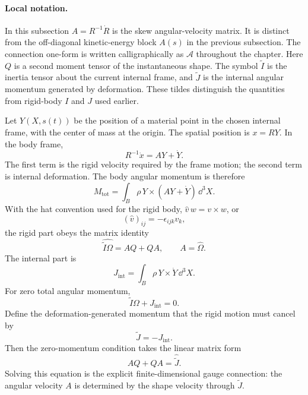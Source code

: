 \paragraph{Local notation.}
In this subsection \(A=R^{-1}\dot R\) is the skew angular-velocity matrix.  It
is distinct from the off-diagonal kinetic-energy block \(A(s)\) in the previous
subsection.  The connection one-form is written calligraphically as
\(\mathcal A\) throughout the chapter.  Here \(Q\) is a second moment tensor of
the instantaneous shape.  The symbol \(\widetilde I\) is the inertia tensor
about the current internal frame, and \(\widetilde J\) is the internal angular
momentum generated by deformation. These tildes distinguish the quantities from
rigid-body \(I\) and \(J\) used earlier.

Let \(Y(X,s(t))\) be the position of a material point in the chosen internal
frame, with the center of mass at the origin. The spatial position is
\(x=RY\). In the body frame,
\[
  R^{-1}\dot x=A Y+\dot Y.
\]
The first term is the rigid velocity required by the frame motion; the second
term is internal deformation. The body angular momentum is therefore
\[
  M_{\mathrm{tot}}
  =
  \int_B\rho\,Y\times(AY+\dot Y)\,\dd^3X.
\]
With the hat convention used for the rigid body,
\(\widehat v\,w=v\times w\), or
\[
  (\widehat v)_{ij}=-\epsilon_{ijk}v_k,
\]
the rigid part obeys the matrix identity
\[
  \widehat{\widetilde I\Omega}=AQ+QA,
  \qquad A=\widehat\Omega.
\]
The internal part is
\[
  J_{\mathrm{int}}
  =
  \int_B\rho\,Y\times\dot Y\,\dd^3X.
\]
For zero total angular momentum,
\[
  \widetilde I\Omega+J_{\mathrm{int}}=0.
\]
Define the deformation-generated momentum that the rigid motion must cancel by
\[
  \widetilde J=-J_{\mathrm{int}}.
\]
Then the zero-momentum condition takes the linear matrix form
\[
  \boxed{
  AQ+QA=\widehat{\widetilde J}.
  }
\]
Solving this equation is the explicit finite-dimensional gauge connection:
the angular velocity \(A\) is determined by the shape velocity through
\(\widetilde J\).

